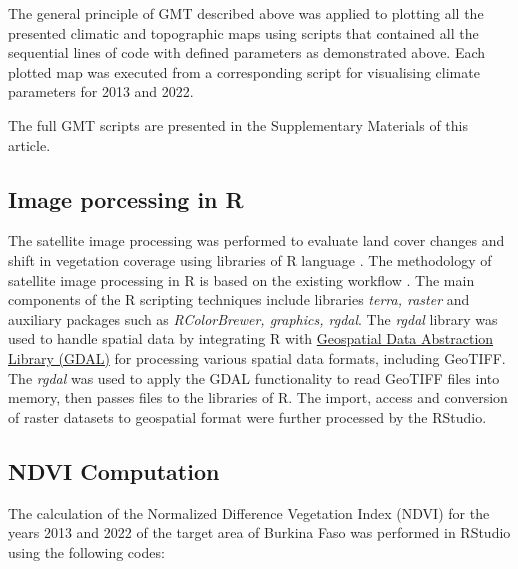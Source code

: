 \documentclass[atmosphere,article,submit,pdftex,moreauthors]{Definitions/mdpi}
\begin{document}
The general principle of GMT described above was applied to plotting all the presented climatic and topographic maps using scripts that contained all the sequential lines of code with defined parameters as demonstrated above. Each plotted map was executed from a corresponding script for visualising climate parameters for 2013 and 2022. 

The full GMT scripts are presented in the Supplementary Materials of this article.    

\subsection{Image porcessing in R}
The satellite image processing was performed to evaluate land cover changes and shift in vegetation coverage using libraries of R language \cite{RCoreTeam}. The methodology of satellite image processing in R is based on the existing workflow \cite{jimaging8120317,app122412554}. The main components of the R scripting techniques include libraries \emph{terra, raster} and auxiliary packages such as \emph{RColorBrewer, graphics, rgdal}. The \emph{rgdal} library was used to handle spatial data by integrating R with \href{https://gdal.org/}{Geospatial Data Abstraction Library (GDAL)} for processing various spatial data formats, including GeoTIFF. The \emph{rgdal} was used to apply the GDAL functionality to read GeoTIFF files into memory, then passes files to the libraries of R. The import, access and conversion of raster datasets to geospatial format were further processed by the RStudio. 
 
 \subsection{NDVI Computation}
 
The calculation of the Normalized Difference Vegetation Index (NDVI) for the years 2013 and 2022 of the target area of Burkina Faso was performed in RStudio using the following codes: 
 
\end{document}
